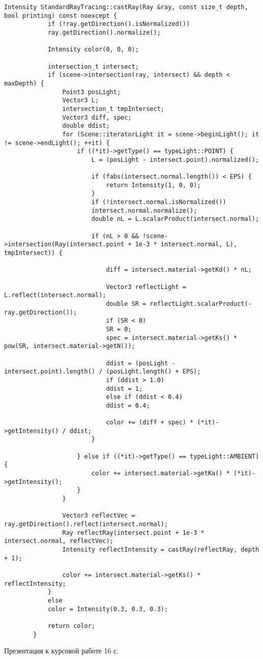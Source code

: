 
\begin{center}
	\captionsetup{justification=raggedright,singlelinecheck=off}
	  \renewcommand{\lstlistingname}{Листинг}
	\begin{lstlisting}[label=lst:castRay, caption=Реализация алгоритма трассировки луча]
		Intensity StandardRayTracing::castRay(Ray &ray, const size_t depth, bool printing) const noexcept {
			if (!ray.getDirection().isNormalized())
			ray.getDirection().normalize();
			
			Intensity color(0, 0, 0);
			
			intersection_t intersect;
			if (scene->intersection(ray, intersect) && depth < maxDepth) {
				Point3 posLight;  
				Vector3 L;          
				intersection_t tmpIntersect;
				Vector3 diff, spec;
				double ddist;
				for (Scene::iteratorLight it = scene->beginLight(); it != scene->endLight(); ++it) {
					if ((*it)->getType() == typeLight::POINT) {
						L = (posLight - intersect.point).normalized();  
						
						if (fabs(intersect.normal.length()) < EPS) {
							return Intensity(1, 0, 0);
						}
						if (!intersect.normal.isNormalized())
						intersect.normal.normalize();
						double nL = L.scalarProduct(intersect.normal);  
						
						if (nL > 0 && !scene->intersection(Ray(intersect.point + 1e-3 * intersect.normal, L), tmpIntersect)) {
							
							diff = intersect.material->getKd() * nL;
							
							Vector3 reflectLight = L.reflect(intersect.normal);
							double SR = reflectLight.scalarProduct(-ray.getDirection());
							if (SR < 0)
							SR = 0;
							spec = intersect.material->getKs() * pow(SR, intersect.material->getN());
							
							ddist = (posLight - intersect.point).length() / (posLight.length() + EPS);
							if (ddist > 1.0)
							ddist = 1;
							else if (ddist < 0.4)
							ddist = 0.4;
							
							color += (diff + spec) * (*it)->getIntensity() / ddist;  
						}
						
					} else if ((*it)->getType() == typeLight::AMBIENT) {
						color += intersect.material->getKa() * (*it)->getIntensity();
					}
				}
				
				Vector3 reflectVec = ray.getDirection().reflect(intersect.normal);
				Ray reflectRay(intersect.point + 1e-3 * intersect.normal, reflectVec);
				Intensity reflectIntensity = castRay(reflectRay, depth + 1);
				
				color += intersect.material->getKs() * reflectIntensity;
			}
			else 
			color = Intensity(0.3, 0.3, 0.3);
			
			return color;
		}
	\end{lstlisting}
\end{center}

\clearpage



Презентация к курсовой работе 16 с.